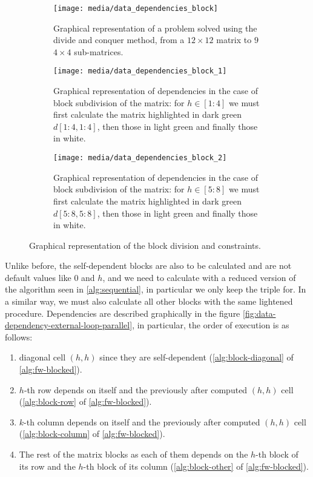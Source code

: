 \begin{figure}[htbp]
    \centering
    \begin{subfigure}[t]{0.3\textwidth}
        \texttt{[image: media/data\_dependencies\_block]}
        \caption{Graphical representation of a problem solved using the divide and conquer method, from a \(12\times 12\) matrix to \(9\) \(4\times 4\) sub-matrices.}
        \label{fig:submatrix}
    \end{subfigure}
    \hfill
    \begin{subfigure}[t]{0.3\textwidth}
        \texttt{[image: media/data\_dependencies\_block\_1]}
        \caption{Graphical representation of dependencies in the case of block subdivision of the matrix: for \(h \in [1:4]\) we must first calculate the matrix highlighted in dark green \(d[1:4,1:4]\), then those in light green and finally those in white.}
        \label{fig:data-dependencies-block-1}
    \end{subfigure}
    \hfill
    \begin{subfigure}[t]{0.3\textwidth}
        \texttt{[image: media/data\_dependencies\_block\_2]}
        \caption{Graphical representation of dependencies in the case of block subdivision of the matrix: for \(h \in [5:8]\) we must first calculate the matrix highlighted in dark green \(d[5:8,5:8]\), then those in light green and finally those in white.}
        \label{fig:data-dependencies-block-2}
    \end{subfigure}
    \caption{Graphical representation of the block division and constraints.}
    \label{fig:data-representation-of-the-block-division-and-constraints}
\end{figure}
Unlike before, the self-dependent blocks are also to be calculated and are not default values like \(0\) and \(h\), and we need to calculate with a reduced version of the algorithm seen in \cref{alg:sequential}, in particular we only keep the triple for. In a similar way, we must also calculate all other blocks with the same lightened procedure. Dependencies are described graphically in the figure \cref{fig:data-dependency-external-loop-parallel}, in particular, the order of execution is as follows:
\begin{enumerate}
    \item diagonal cell \((h,h)\) since they are self-dependent (\cref{alg:block-diagonal} of \cref{alg:fw-blocked}).
    \item \(h\)-th row depends on itself and the previously after computed  \((h,h)\) cell (\cref{alg:block-row}  of \cref{alg:fw-blocked}).
    \item \(k\)-th column depends on itself and the previously after computed  \((h,h)\) cell (\cref{alg:block-column}  of \cref{alg:fw-blocked}).
    \item The rest of the matrix blocks as each of them depends on the \(h\)-th block of its row and the \(h\)-th block of its column (\cref{alg:block-other}  of \cref{alg:fw-blocked}).
\end{enumerate}


